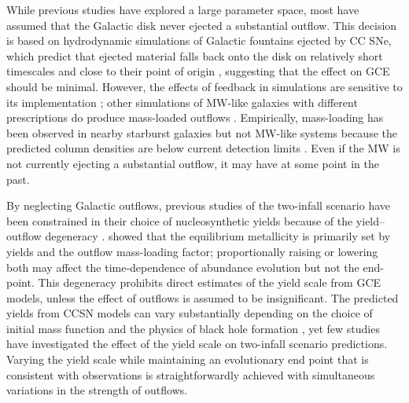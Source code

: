 \documentclass[twocolumn,twocolappendix,linenumbers]{aastex631}
\newcommand{\todo}[1]{{\color{red}#1}}
\begin{document}
While previous studies have explored a large parameter space, most have assumed that the Galactic disk never ejected a substantial outflow. This decision is based on hydrodynamic simulations of Galactic fountains ejected by CC SNe, which predict that ejected material falls back onto the disk on relatively short timescales \citep{spitoni_galactic_2008,spitoni_effects_2009} and close to their point of origin \citep{melioli_hydrodynamical_2008,melioli_hydrodynamical_2009}, suggesting that the effect on GCE should be minimal. However, the effects of feedback in simulations are sensitive to its implementation \citep[e.g.,][]{li_effects_2020,hu_code_2023}; other simulations of MW-like galaxies with different prescriptions do produce mass-loaded outflows \citep[e.g.,][]{brook_hierarchical_2011,gutcke_nihao_2017,nelson_first_2019,peschken_angular_2021,kopenhafer_seeking_2023}. Empirically, mass-loading has been observed in nearby starburst galaxies \citep[e.g.,][]{lopez_temperature_2020,cameron_duvet_2021,lopez_x-ray_2023} but not MW-like systems because the predicted column densities are below current detection limits \citep[see reviews by][]{veilleux_cool_2020,thompson_theory_2024}. Even if the MW is not currently ejecting a substantial outflow, it may have at some point in the past.

By neglecting Galactic outflows, previous studies of the two-infall scenario have been constrained in their choice of nucleosynthetic yields \citep{francois_evolution_2004} because of the yield--outflow degeneracy \citep[e.g.,][]{hartwick_chemical_1976,cooke_primordial_2022,johnson_dwarf_2023,sandford_strong_2024}. \citet{weinberg_equilibrium_2017} showed that the equilibrium metallicity is primarily set by yields and the outflow mass-loading factor; proportionally raising or lowering both may affect the time-dependence of abundance evolution but not the end-point. This degeneracy prohibits direct estimates of the yield scale from GCE models, unless the effect of outflows is assumed to be insignificant. The predicted yields from CCSN models can vary substantially depending on the choice of initial mass function \citep{vincenzo_modern_2016} and the physics of black hole formation \citep{griffith_impact_2021}, yet few studies have investigated the effect of the yield scale on two-infall scenario predictions. Varying the yield scale while maintaining an evolutionary end point that is consistent with observations is straightforwardly achieved with simultaneous variations in the strength of outflows.
\end{document}
